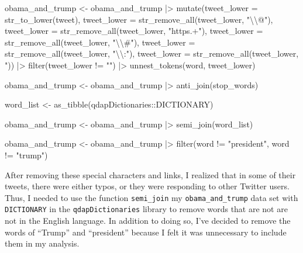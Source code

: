 \documentclass[
  letterpaper,
  DIV=11,
  numbers=noendperiod]{scrartcl}
\newenvironment{Shaded}{\begin{snugshade}}{\end{snugshade}}
\newcommand{\AttributeTok}[1]{\textcolor[rgb]{0.40,0.45,0.13}{#1}}
\newcommand{\FunctionTok}[1]{\textcolor[rgb]{0.28,0.35,0.67}{#1}}
\newcommand{\NormalTok}[1]{\textcolor[rgb]{0.00,0.23,0.31}{#1}}
\newcommand{\OtherTok}[1]{\textcolor[rgb]{0.00,0.23,0.31}{#1}}
\newcommand{\SpecialCharTok}[1]{\textcolor[rgb]{0.37,0.37,0.37}{#1}}
\newcommand{\StringTok}[1]{\textcolor[rgb]{0.13,0.47,0.30}{#1}}
\begin{document}
\begin{Shaded}
\begin{Highlighting}[]
\NormalTok{obama\_and\_trump }\OtherTok{\textless{}{-}}\NormalTok{ obama\_and\_trump }\SpecialCharTok{|\textgreater{}}
  \FunctionTok{mutate}\NormalTok{(}\AttributeTok{tweet\_lower =} \FunctionTok{str\_to\_lower}\NormalTok{(tweet), }
         \AttributeTok{tweet\_lower =} \FunctionTok{str\_remove\_all}\NormalTok{(tweet\_lower, }\StringTok{"}\SpecialCharTok{\textbackslash{}\textbackslash{}}\StringTok{@"}\NormalTok{),}
         \AttributeTok{tweet\_lower =} \FunctionTok{str\_remove\_all}\NormalTok{(tweet\_lower, }\StringTok{"https.+"}\NormalTok{),}
         \AttributeTok{tweet\_lower =} \FunctionTok{str\_remove\_all}\NormalTok{(tweet\_lower, }\StringTok{"}\SpecialCharTok{\textbackslash{}\textbackslash{}}\StringTok{\#"}\NormalTok{),}
         \AttributeTok{tweet\_lower =} \FunctionTok{str\_remove\_all}\NormalTok{(tweet\_lower, }\StringTok{"}\SpecialCharTok{\textbackslash{}\textbackslash{}}\StringTok{:"}\NormalTok{),}
         \AttributeTok{tweet\_lower =} \FunctionTok{str\_remove\_all}\NormalTok{(tweet\_lower, }\StringTok{\textquotesingle{}"\textquotesingle{}}\NormalTok{)) }\SpecialCharTok{|\textgreater{}} 
  \FunctionTok{filter}\NormalTok{(tweet\_lower }\SpecialCharTok{!=} \StringTok{""}\NormalTok{) }\SpecialCharTok{|\textgreater{}}
  \FunctionTok{unnest\_tokens}\NormalTok{(word, tweet\_lower) }


\NormalTok{obama\_and\_trump }\OtherTok{\textless{}{-}}\NormalTok{ obama\_and\_trump }\SpecialCharTok{|\textgreater{}}
  \FunctionTok{anti\_join}\NormalTok{(stop\_words)}


\NormalTok{word\_list }\OtherTok{\textless{}{-}} \FunctionTok{as\_tibble}\NormalTok{(qdapDictionaries}\SpecialCharTok{::}\NormalTok{DICTIONARY)}


\NormalTok{obama\_and\_trump }\OtherTok{\textless{}{-}}\NormalTok{ obama\_and\_trump }\SpecialCharTok{|\textgreater{}}
  \FunctionTok{semi\_join}\NormalTok{(word\_list) }

\NormalTok{obama\_and\_trump }\OtherTok{\textless{}{-}}\NormalTok{ obama\_and\_trump }\SpecialCharTok{|\textgreater{}}
  \FunctionTok{filter}\NormalTok{(word }\SpecialCharTok{!=} \StringTok{"president"}\NormalTok{, word }\SpecialCharTok{!=} \StringTok{"trump"}\NormalTok{)}
\end{Highlighting}
\end{Shaded}

After removing these special characters and links, I realized that in
some of their tweets, there were either typos, or they were responding
to other Twitter users. Thus, I needed to use the function
\texttt{semi\_join} my \texttt{obama\_and\_trump} data set with
\texttt{DICTIONARY} in the \texttt{qdapDictionaries} library to remove
words that are not are not in the English language. In addition to doing
so, I've decided to remove the words of ``Trump'' and ``president''
because I felt it was unnecessary to include them in my analysis.
\end{document}
